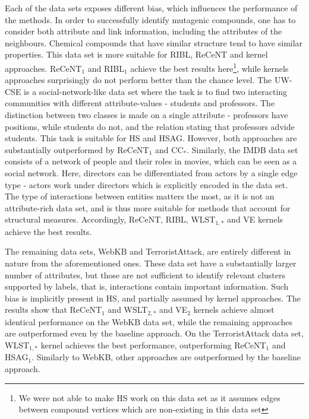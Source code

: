 Each of the data sets exposes different bias, which influences the performance of the methods.
In order to successfully identify mutagenic compounds, one has to consider both attribute and link information, including the attributes of the neighbours.
Chemical compounds that have similar structure tend to have similar properties.
This data set is more suitable for RIBL, ReCeNT and kernel approaches.
ReCeNT$_1$ and RIBL$_1$ achieve the best results here\footnote{We were not able to make HS work on this data set as it assumes edges between compound vertices which are non-existing in this data set}, while kernels approaches surprisingly do not perform better than the chance level.
The UW-CSE is a social-network-like data set where the task is to find two interacting  communities with different attribute-values - students and professors.
The distinction between two classes is made on a single attribute - professors have positions, while students do not, and the relation stating that professors advide students.
This task is suitable for HS and HSAG.
However, both approaches are substantially outperformed by ReCeNT$_1$ and CC$_*$.
Similarly, the IMDB data set consists of a network of people and their roles in movies, which can be seen as a social network.
Here, directors can be differentiated from actors by a single edge type - actors work under directors which is explicitly encoded in the data set.
The type of interactions between entities matters the most, as it is not an attribute-rich data set, and is thus more suitable for methods that account for structural measures.
Accordingly, ReCeNT, RIBL, WLST$_{1,*}$ and VE  kernels achieve the best results.
\vspace{2pt}




The remaining data sets, WebKB and TerroristAttack, are entirely different in nature from the aforementioned ones.
These data set have a substantially larger number of attributes, but those are not sufficient to identify relevant clusters supported by labels, that is,  interactions contain important information.
Such bias is implicitly present in HS, and partially assumed by kernel approaches.
The results show that ReCeNT$_1$ and WSLT$_{2,*}$ and VE$_2$ kernels achieve almost identical performance on the WebKB data set, while the remaining approaches are outperformed even by the baseline approach.
On the TerroristAttack data set, WLST$_{1,*}$ kernel achieves the best performance, outperforming ReCeNT$_1$ and HSAG$_1$.
Similarly to WebKB, other approaches are outperformed by the baseline approach.
\vspace{2pt}





